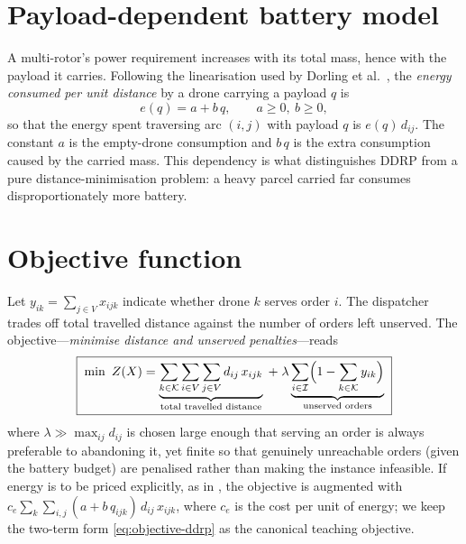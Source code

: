 \documentclass[11pt,a4paper]{article}
\begin{document}
\section{Payload-dependent battery model}

A multi-rotor's power requirement increases with its total mass, hence with the
payload it carries. Following the linearisation used by Dorling et al.\
\cite{dorling2016}, the \emph{energy consumed per unit distance} by a drone
carrying a payload $q$ is
\begin{equation}
  e(q) = a + b\,q, \qquad a \ge 0,\ b \ge 0 ,
  \label{eq:energy-rate}
\end{equation}
so that the energy spent traversing arc $(i,j)$ with payload $q$ is
$e(q)\,d_{ij}$. The constant $a$ is the empty-drone consumption and $b\,q$ is
the extra consumption caused by the carried mass. This dependency is what
distinguishes DDRP from a pure distance-minimisation problem: a heavy parcel
carried far consumes disproportionately more battery.

\section{Objective function}

Let $y_{ik}=\sum_{j\in V} x_{ijk}$ indicate whether drone $k$ serves order $i$.
The dispatcher trades off total travelled distance against the number of orders
left unserved. The objective---\emph{minimise distance and unserved
penalties}---reads
\begin{equation}
  \boxed{\;
  \min \ Z(X)
  = \underbrace{\sum_{k\in\mathcal{K}} \sum_{i\in V} \sum_{j\in V}
      d_{ij}\, x_{ijk}}_{\text{total travelled distance}}
  \;+\; \lambda
    \underbrace{\sum_{i\in\mathcal{I}} \Bigl(1-\sum_{k\in\mathcal{K}} y_{ik}\Bigr)}_{\text{unserved orders}}
  \;}
  \label{eq:objective-ddrp}
\end{equation}
where $\lambda \gg \max_{ij} d_{ij}$ is chosen large enough that serving an
order is always preferable to abandoning it, yet finite so that genuinely
unreachable orders (given the battery budget) are penalised rather than making
the instance infeasible. If energy is to be priced explicitly, as in
\cite{dorling2016}, the objective is augmented with
$c_{e}\sum_{k}\sum_{i,j}(a+b\,q_{ijk})\,d_{ij}\,x_{ijk}$, where $c_{e}$ is the
cost per unit of energy; we keep the two-term form \eqref{eq:objective-ddrp} as
the canonical teaching objective.
\end{document}
